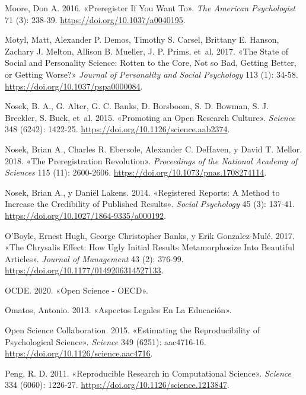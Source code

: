 \documentclass[
  spanish,
  a4paper,
  oneside]{scrbook}
\newlength{\cslhangindent}
\newenvironment{CSLReferences}[2] %
 {\begin{list}{}{%
  \setlength{\itemindent}{0pt}
  \setlength{\leftmargin}{0pt}
  \setlength{\parsep}{0pt}
  \ifodd #1
   \setlength{\leftmargin}{\cslhangindent}
   \setlength{\itemindent}{-1\cslhangindent}
  \fi
  \setlength{\itemsep}{#2\baselineskip}}}
 {\end{list}}
\begin{document}
\begin{CSLReferences}{1}{0}
Moore, Don A. 2016. {«Preregister If You Want To»}. \emph{The American
Psychologist} 71 (3): 238-39. \url{https://doi.org/10.1037/a0040195}.

Motyl, Matt, Alexander P. Demos, Timothy S. Carsel, Brittany E. Hanson,
Zachary J. Melton, Allison B. Mueller, J. P. Prims, et~al. 2017. {«The
State of Social and Personality Science: {Rotten} to the Core, Not so
Bad, Getting Better, or Getting Worse?»} \emph{Journal of Personality
and Social Psychology} 113 (1): 34-58.
\url{https://doi.org/10.1037/pspa0000084}.

Nosek, B. A., G. Alter, G. C. Banks, D. Borsboom, S. D. Bowman, S. J.
Breckler, S. Buck, et~al. 2015. {«Promoting an Open Research Culture»}.
\emph{Science} 348 (6242): 1422-25.
\url{https://doi.org/10.1126/science.aab2374}.

Nosek, Brian A., Charles R. Ebersole, Alexander C. DeHaven, y David T.
Mellor. 2018. {«The Preregistration Revolution»}. \emph{Proceedings of
the National Academy of Sciences} 115 (11): 2600-2606.
\url{https://doi.org/10.1073/pnas.1708274114}.

Nosek, Brian A., y Daniël Lakens. 2014. {«Registered {Reports}: {A
Method} to {Increase} the {Credibility} of {Published Results}»}.
\emph{Social Psychology} 45 (3): 137-41.
\url{https://doi.org/10.1027/1864-9335/a000192}.

O'Boyle, Ernest Hugh, George Christopher Banks, y Erik Gonzalez-Mulé.
2017. {«The {Chrysalis Effect}: {How Ugly Initial Results Metamorphosize
Into Beautiful Articles}»}. \emph{Journal of Management} 43 (2): 376-99.
\url{https://doi.org/10.1177/0149206314527133}.

OCDE. 2020. {«Open {Science} - {OECD}»}.

Omatos, Antonio. 2013. {«Aspectos {Legales} En La {Educaci{ó}n}»}.

Open Science Collaboration. 2015. {«Estimating the Reproducibility of
Psychological Science»}. \emph{Science} 349 (6251): aac4716-16.
\url{https://doi.org/10.1126/science.aac4716}.

Peng, R. D. 2011. {«Reproducible {Research} in {Computational
Science}»}. \emph{Science} 334 (6060): 1226-27.
\url{https://doi.org/10.1126/science.1213847}.


\end{CSLReferences}
\end{document}
